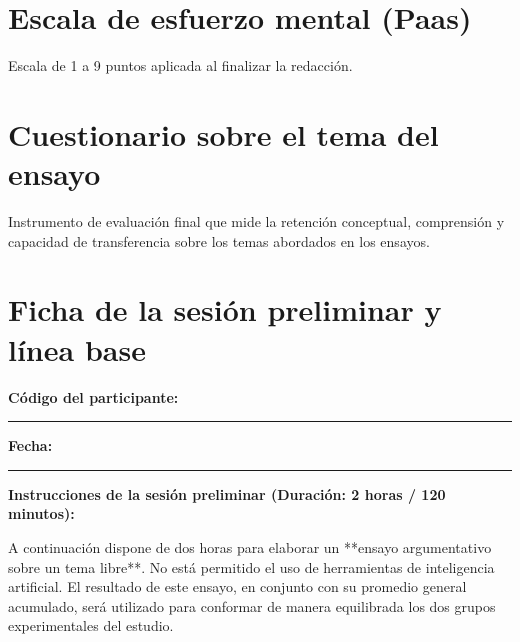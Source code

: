 \documentclass[12pt,a4paper,openany]{report}
\begin{document}
    \chapter{Escala de esfuerzo mental (Paas)}
    \label{anx:paas}
    
    Escala de 1 a 9 puntos aplicada al finalizar la redacci\'on.
    
    \chapter{Cuestionario sobre el tema del ensayo}
    \label{anx:prueba}
    
    Instrumento de evaluaci\'on final que mide la retenci\'on conceptual, comprensi\'on y capacidad de transferencia sobre los temas abordados en los ensayos.
    
    \chapter{Ficha de la sesi\'on preliminar y l\'inea base}
    \label{anx:linea}
    
    \textbf{C\'odigo del participante:} \rule{3.0cm}{0.4pt} \quad \textbf{Fecha:} \rule{2.2cm}{0.4pt}
    
    \vspace{8pt}
    \textbf{Instrucciones de la sesi\'on preliminar (Duraci\'on: 2 horas / 120 minutos):}
    
    A continuaci\'on dispone de dos horas para elaborar un **ensayo argumentativo sobre un tema libre**. No est\'a permitido el uso de herramientas de inteligencia artificial. El resultado de este ensayo, en conjunto con su promedio general acumulado, ser\'a utilizado para conformar de manera equilibrada los dos grupos experimentales del estudio.
    
    
    
\end{document}
